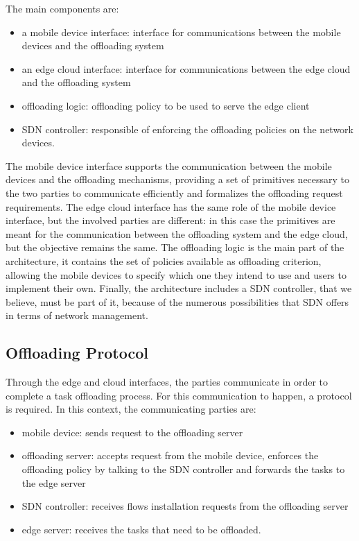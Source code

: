 The main components are:
\begin{itemize}
\item a mobile device interface: interface for communications between the mobile devices and the offloading system
\item an edge cloud interface: interface for communications between the edge cloud and the offloading system
\item offloading logic: offloading policy to be used to serve the edge client
\item SDN controller: responsible of enforcing the offloading policies on the network devices.
\end{itemize}

The mobile device interface supports the communication between the mobile devices and the offloading mechanisms, providing a set of primitives necessary to the two parties to communicate efficiently and formalizes the offloading request requirements. The edge cloud interface has the same role of the mobile device interface, but the involved parties are different: in this case the primitives are meant for the communication between the offloading system and the edge cloud, but the objective remains the same. The offloading logic is the main part of the architecture, it contains the set of policies available as offloading criterion, allowing the mobile devices to specify which one they intend to use and users to implement their own. Finally, the architecture includes a SDN controller, that we believe, must be part of it, because of the numerous possibilities that SDN offers in terms of network management.  

\subsection{Offloading Protocol}
Through the edge and cloud interfaces, the parties communicate in order to complete a task offloading process. For this communication to happen, a protocol is required. In this context, the communicating parties are:
\begin{itemize}
    \item mobile device: sends request to the offloading server
    \item offloading server: accepts request from the mobile device, enforces the offloading policy by talking to the SDN controller and forwards the tasks to the edge server
    \item SDN controller: receives flows installation requests from the offloading server
    \item edge server: receives the tasks that need to be offloaded.
\end{itemize}

